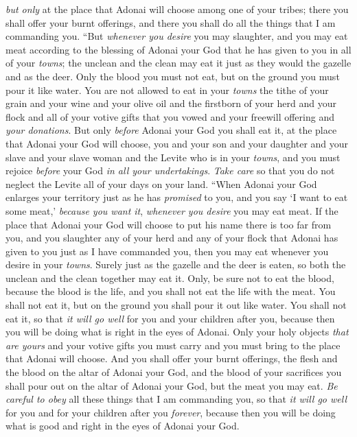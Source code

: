\begin{biblechapter}
\verse \textit{but only} at the place that Adonai will choose among one of your tribes; there you shall offer your burnt offerings, and there you shall do all the things that I am commanding you.
\verse “But \textit{whenever you desire} you may slaughter, and you may eat meat according to the blessing of Adonai your God that he has given to you in all of your \textit{towns}; the unclean and the clean may eat it just as they would the gazelle and as the deer.
\verse Only the blood you must not eat, but on the ground you must pour it like water.
\verse You are not allowed to eat in your \textit{towns} the tithe of your grain and your wine and your olive oil and the firstborn of your herd and your flock and all of your votive gifts that you vowed and your freewill offering and \textit{your donations}.
\verse But only \textit{before} Adonai your God you shall eat it, at the place that Adonai your God will choose, you and your son and your daughter and your slave and your slave woman and the Levite who is in your \textit{towns}, and you must rejoice \textit{before} your God \textit{in all your undertakings}.
\verse \textit{Take care} so that you do not neglect the Levite all of your days on your land.
\verse “When Adonai your God enlarges your territory just as he has \textit{promised} to you, and you say ‘I want to eat some meat,’ \textit{because you want it}, \textit{whenever you desire} you may eat meat.
\verse If the place that Adonai your God will choose to put his name there is too far from you, and you slaughter any of your herd and any of your flock that Adonai has given to you just as I have commanded you, then you may eat whenever you desire in your \textit{towns}.
\verse Surely just as the gazelle and the deer is eaten, so both the unclean and the clean together may eat it.
\verse Only, be sure not to eat the blood, because the blood is the life, and you shall not eat the life with the meat.
\verse You shall not eat it, but on the ground you shall pour it out like water.
\verse You shall not eat it, so that \textit{it will go well} for you and your children after you, because then you will be doing what is right in the eyes of Adonai.
\verse Only your holy objects \textit{that are yours} and your votive gifts you must carry and you must bring to the place that Adonai will choose.
\verse And you shall offer your burnt offerings, the flesh and the blood on the altar of Adonai your God, and the blood of your sacrifices you shall pour out on the altar of Adonai your God, but the meat you may eat.
\verse \textit{Be careful to obey} all these things that I am commanding you, so that \textit{it will go well} for you and for your children after you \textit{forever}, because then you will be doing what is good and right in the eyes of Adonai your God.

\end{biblechapter}
